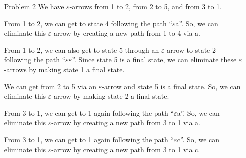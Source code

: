 \documentclass[12pt,letterpaper]{article}
\begin{document}
\begin{enumerate}

    \pagebreak

    \item[Problem 2]
      We have $\varepsilon$-arrows from 1 to 2, from 2 to 5, and from 3 to 1.

      From 1 to 2, we can get to state 4 following the path ``$\varepsilon$a''.
      So, we can eliminate this $\varepsilon$-arrow by creating a new path from 1 to 4 via a.

      From 1 to 2, we can also get to state 5 through an $\varepsilon$-arrow to state 2 following the path ``$\varepsilon\varepsilon$''.
      Since state 5 is a final state, we can eliminate these $\varepsilon$-arrows by making state 1 a final state.

      We can get from 2 to 5 via an $\varepsilon$-arrow and state 5 is a final state.
      So, we can eliminate this $\varepsilon$-arrow by making state 2 a final state.

      From 3 to 1, we can get to 1 again following the path ``$\varepsilon$a''.
      So, we can eliminate this $\varepsilon$-arrow by creating a new path from 3 to 1 via a.

      From 3 to 1, we can get to 1 again following the path ``$\varepsilon$c''.
      So, we can eliminate this $\varepsilon$-arrow by creating a new path from 3 to 1 via c.


\end{enumerate}
\end{document}
